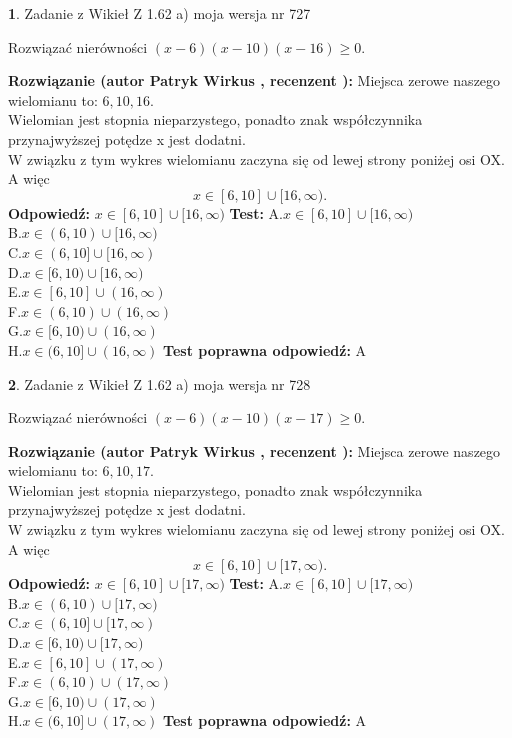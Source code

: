 \documentclass[12pt, a4paper]{article}
\theoremstyle{definition} %
\newtheorem{zad}{}
\newcommand{\zadStart}[1]{\begin{zad}#1\newline}
\newcommand{\zadStop}{\end{zad}}
\newcommand{\rozwStart}[2]{\noindent \textbf{Rozwiązanie (autor #1 , recenzent #2): }\newline}
\newcommand{\rozwStop}{\newline}
\newcommand{\odpStart}{\noindent \textbf{Odpowiedź:}\newline}
\newcommand{\odpStop}{\newline}
\newcommand{\testStart}{\noindent \textbf{Test:}\newline}
\newcommand{\testStop}{\newline}
\newcommand{\kluczStart}{\noindent \textbf{Test poprawna odpowiedź:}\newline}
\newcommand{\kluczStop}{\newline}
\begin{document}
\zadStart{Zadanie z Wikieł Z 1.62 a) moja wersja nr 727}

Rozwiązać nierówności $(x-6)(x-10)(x-16)\ge0$.
\zadStop
\rozwStart{Patryk Wirkus}{}
Miejsca zerowe naszego wielomianu to: $6, 10, 16$.\\
Wielomian jest stopnia nieparzystego, ponadto znak współczynnika przy\linebreak najwyższej potędze x jest dodatni.\\ W związku z tym wykres wielomianu zaczyna się od lewej strony poniżej osi OX. A więc $$x \in [6,10] \cup [16,\infty).$$
\rozwStop
\odpStart
$x \in [6,10] \cup [16,\infty)$
\odpStop
\testStart
A.$x \in [6,10] \cup [16,\infty)$\\
B.$x \in (6,10) \cup [16,\infty)$\\
C.$x \in (6,10] \cup [16,\infty)$\\
D.$x \in [6,10) \cup [16,\infty)$\\
E.$x \in [6,10] \cup (16,\infty)$\\
F.$x \in (6,10) \cup (16,\infty)$\\
G.$x \in [6,10) \cup (16,\infty)$\\
H.$x \in (6,10] \cup (16,\infty)$
\testStop
\kluczStart
A
\kluczStop



\zadStart{Zadanie z Wikieł Z 1.62 a) moja wersja nr 728}

Rozwiązać nierówności $(x-6)(x-10)(x-17)\ge0$.
\zadStop
\rozwStart{Patryk Wirkus}{}
Miejsca zerowe naszego wielomianu to: $6, 10, 17$.\\
Wielomian jest stopnia nieparzystego, ponadto znak współczynnika przy\linebreak najwyższej potędze x jest dodatni.\\ W związku z tym wykres wielomianu zaczyna się od lewej strony poniżej osi OX. A więc $$x \in [6,10] \cup [17,\infty).$$
\rozwStop
\odpStart
$x \in [6,10] \cup [17,\infty)$
\odpStop
\testStart
A.$x \in [6,10] \cup [17,\infty)$\\
B.$x \in (6,10) \cup [17,\infty)$\\
C.$x \in (6,10] \cup [17,\infty)$\\
D.$x \in [6,10) \cup [17,\infty)$\\
E.$x \in [6,10] \cup (17,\infty)$\\
F.$x \in (6,10) \cup (17,\infty)$\\
G.$x \in [6,10) \cup (17,\infty)$\\
H.$x \in (6,10] \cup (17,\infty)$
\testStop
\kluczStart
A
\kluczStop
\end{document}
